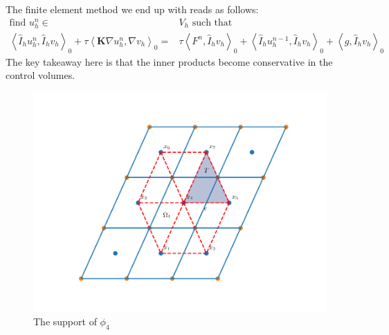 \documentclass[../Main/main.tex]{subfiles}
\begin{document}
	The finite element method we end up with reads as follows:
	\begin{equation} \label{eq:modified_fem}
		\begin{aligned}
			\text{find }u_h^n\in&V_h \text{ such that}\\
			\left \langle \hat{I}_h u_h^n,\hat{I}_h v_h \right \rangle_0 + \tau  \left \langle \pmb{K} \nabla u_h^n,\nabla v_h \right \rangle_0 =&\tau \left \langle F^n,\hat{I}_h v_h \right \rangle_{0} + \left \langle \hat{I}_h u_h^{n-1},\hat{I}_h v_h\right \rangle_0 + \left \langle g,\hat{I}_h v_h \right \rangle_{0} 
		\end{aligned}
	\end{equation}
	The key takeaway here is that the inner products become conservative in the control volumes.
	\par
		\begin{figure}[H]\label{fig:control volume}
		\centering
		\includegraphics[width=1\textwidth]{Control volume.pdf}
		\caption{The support of $\phi_4$}
	\end{figure}
\end{document}
